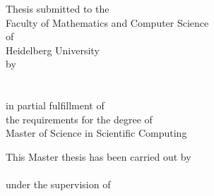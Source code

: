 
\thispagestyle{empty}
\vspace*{1.5cm}
\begin{center}
	\doublespacing
	\Large\bfseries\sffamily
	\thesisTitle
\end{center}
\vspace{3.5cm}
\begin{center}
	\large
	\onehalfspacing
	Thesis submitted to the \\Faculty of Mathematics and Computer Science \\of \\ Heidelberg University\\
	by\\
	\authorName \\
	\submissionYear \\
	\vspace{3.5cm}
	in partial fulfillment of \\the requirements for the degree of \\
	{Master of Science in Scientific Computing}

\end{center}
\addBlank
\newpage

\thispagestyle{empty}
\vspace*{1.5cm}
\begin{center}
	\doublespacing
  	\Large\bfseries\sffamily
    \thesisTitle
\end{center}\par
\vspace*{11cm}
\begin{center}
	\doublespacing
	\large\normalfont
	This Master thesis has been carried out by \\
	\authorName\\
	under the supervision of\\
	\supervisors
\end{center}\par

\addBlank
